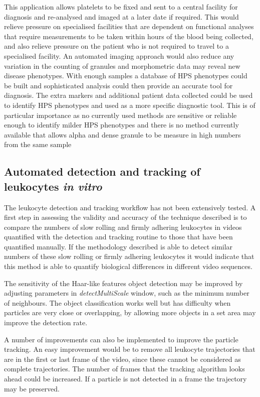 This application allows platelets to be fixed and sent to a central facility for diagnosis and re-analysed and imaged at a later date if required. This would relieve pressure on specialised facilities that are dependent on functional analyses that require measurements to be taken within hours of the blood being collected, and also relieve pressure on the patient who is not required to travel to a specialised facility. An automated imaging approach would also reduce any variation in the counting of granules and morphometric data may reveal new disease phenotypes. With enough samples a database of HPS phenotypes could be built and sophisticated analysis could then provide an accurate tool for diagnosis. The extra markers and additional patient data collected could be used to identify HPS phenotypes and used as a more specific diagnostic tool. This is of particular importance as no currently used methods are sensitive or reliable enough to identify milder HPS phenotypes and there is no method currently available that allows alpha and dense granule to be measure in high numbers from the same sample

\subsection{Automated detection and tracking of leukocytes \emph{in vitro}}
The leukocyte detection and tracking workflow has not been extensively tested. A first step in assessing the validity and accuracy of the technique described is to compare the numbers of slow rolling and firmly adhering leukocytes in videos quantified with the detection and tracking routine to those that have been quantified manually. If the methodology described is able to detect similar numbers of these slow rolling or firmly adhering leukocytes it would indicate that this method is able to quantify biological differences in different video sequences.

The sensitivity of the Haar-like features object detection may be improved by adjusting parameters in \emph{detectMultiScale} window, such as the minimum number of neighbours. The object classification works well but has difficulty when particles are very close or overlapping, by allowing more objects in a set area may improve the detection rate.

A number of improvements can also be implemented to improve the particle tracking. An easy improvement would be to remove all leukocyte trajectories that are in the first or last frame of the video, since these cannot be considered as complete trajectories. The number of frames that the tracking algorithm looks ahead could be increased. If a particle is not detected in a frame the trajectory may be preserved.

